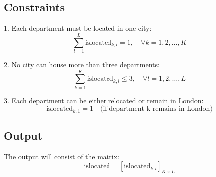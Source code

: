 \documentclass{article}
\begin{document}
\subsection*{Constraints}
1. Each department must be located in one city:
\[
\sum_{l=1}^{L} \text{islocated}_{k, l} = 1, \quad \forall k = 1, 2, \ldots, K
\]

2. No city can house more than three departments:
\[
\sum_{k=1}^{K} \text{islocated}_{k, l} \leq 3, \quad \forall l = 1, 2, \ldots, L
\]

3. Each department can be either relocated or remain in London:
\[
\text{islocated}_{k, 1} = 1 \quad \text{(if department k remains in London)}
\]

\subsection*{Output}
The output will consist of the matrix:
\[
\text{islocated} = \left[ \text{islocated}_{k, l} \right]_{K \times L}
\]
\end{document}
